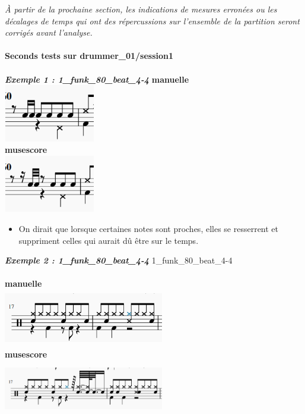 \textit{À partir de la prochaine section, les indications de mesures erronées ou les décalages de temps qui ont des répercussions sur l’ensemble de la partition seront corrigés avant l’analyse.}\\\\
\textbf{Seconds tests sur drummer\_01/session1}\\\\
\textbf{\textit{Exemple 1 : 1\_funk\_80\_beat\_4-4}}
\textbf{manuelle}\\
\includegraphics[height=25mm, width=40mm]{images/transcriptions_manuelles/0_prise_en_main/1_drummer_01__session1/Manuelle_0.png} \\
\textbf{musescore}\\
\includegraphics[height=25mm, width=40mm]{images/transcriptions_manuelles/0_prise_en_main/1_drummer_01__session1/musescore_0.png} \\
\begin{itemize}
	\item On dirait que lorsque certaines notes sont proches, elles se resserrent et suppriment celles qui aurait dû être sur le temps.\\
\end{itemize}
\textbf{\textit{Exemple 2 : 1\_funk\_80\_beat\_4-4}}
1\_funk\_80\_beat\_4-4\\\\
\textbf{manuelle}\\
\includegraphics[height=25mm, width=70mm]{images/transcriptions_manuelles/0_prise_en_main/1_drummer_01__session1/Manuelle_1.png} \\
\textbf{musescore}\\
\includegraphics[height=25mm, width=70mm]{images/transcriptions_manuelles/0_prise_en_main/1_drummer_01__session1/MuseScore_1.png} \\
